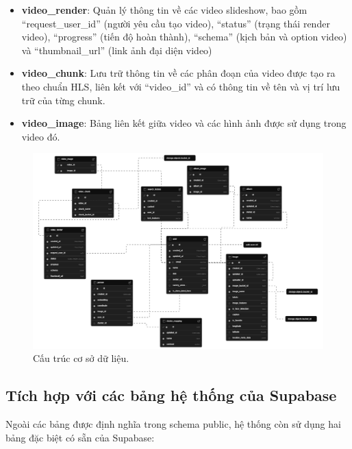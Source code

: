 \begin{itemize}
    \item \textbf{video\_render}: Quản lý thông tin về các video slideshow, bao gồm ``request\_user\_id'' (người yêu cầu tạo video), ``status'' (trạng thái render video), ``progress'' (tiến độ hoàn thành), ``schema'' (kịch bản và option video) và ``thumbnail\_url'' (link ảnh đại diện video)
    
    \item \textbf{video\_chunk}: Lưu trữ thông tin về các phân đoạn của video được tạo ra theo chuẩn HLS, liên kết với ``video\_id'' và có thông tin về tên và vị trí lưu trữ của từng chunk.
    
    \item \textbf{video\_image}: Bảng liên kết giữa video và các hình ảnh được sử dụng trong video đó.
\end{itemize}

\begin{figure}[H]
    \centering  
    \includegraphics[width=1\textwidth]{figures/c3/3-4-database-graph.png}
    \caption{Cấu trúc cơ sở dữ liệu.}
    \label{fig:3-4-database-diagram}
\end{figure}

\subsection{Tích hợp với các bảng hệ thống của Supabase}

Ngoài các bảng được định nghĩa trong schema public, hệ thống còn sử dụng hai bảng đặc biệt có sẵn của Supabase:

